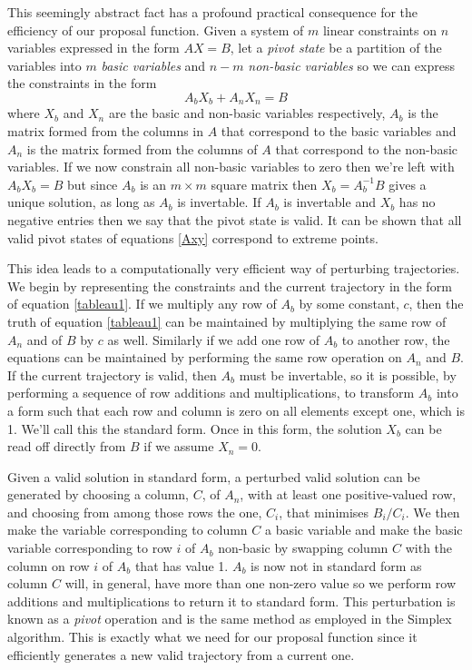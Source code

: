 \documentclass{article}
\begin{document}
This seemingly abstract fact has a profound practical consequence for the efficiency of our proposal function.
Given a system of $m$ linear constraints on $n$ variables expressed in the form $AX=B$, let a \textit{pivot state} be a partition of the variables into $m$ \textit{basic variables} and $n-m$ \textit{non-basic variables} so we can express the constraints in the form
\begin{equation}
A_bX_b + A_nX_n = B
\label{tableau1}
\end{equation}
where $X_b$ and $X_n$ are the basic and non-basic variables respectively, $A_b$ is the matrix formed from the columns in $A$ that correspond to the basic variables and $A_n$ is the matrix formed from the columns of $A$ that correspond to the non-basic variables. If we now constrain all non-basic variables to zero then we're left with $A_bX_b = B$ but since $A_b$ is an $m \times m$ square matrix then $X_b = A_b^{-1}B$ gives a unique solution, as long as $A_b$ is invertable. If $A_b$ is invertable and $X_b$ has no negative entries then we say that the pivot state is valid. It can be shown that all valid pivot states of equations \ref{Axy} correspond to extreme points\cite{dantzig1955generalized}.

This idea leads to a computationally very efficient way of perturbing trajectories. We begin by representing the constraints and the current trajectory in the form of equation \ref{tableau1}. If we multiply any row of $A_b$ by some constant, $c$, then the truth of equation \ref{tableau1} can be maintained by multiplying the same row of $A_n$ and of $B$ by $c$ as well. Similarly if we add one row of $A_b$ to another row, the equations can be maintained by performing the same row operation on $A_n$ and $B$. If the current trajectory is valid, then $A_b$ must be invertable, so it is possible, by performing a sequence of row additions and multiplications, to transform $A_b$ into a form such that each row and column is zero on all elements except one, which is 1. We'll call this the standard form. Once in this form, the solution $X_b$ can be read off directly from $B$ if we assume $X_n = 0$.

Given a valid solution in standard form, a perturbed valid solution can be generated by choosing a column, $C$, of $A_n$, with at least one positive-valued row, and choosing from among those rows the one, $C_i$, that minimises $B_i/C_i$. We then make the variable corresponding to column $C$ a basic variable and make the basic variable corresponding to row $i$ of $A_b$ non-basic by swapping column $C$ with the column on row $i$ of $A_b$ that has value 1. $A_b$ is now not in standard form as column $C$ will, in general, have more than one non-zero value so we perform row additions and multiplications to return it to standard form. This perturbation is known as a \textit{pivot} operation and is the same method as employed in the Simplex algorithm\cite{dantzig1955generalized}\cite{vanderbei2015linear}. This is exactly what we need for our proposal function since it efficiently generates a new valid trajectory from a current one.
\end{document}
